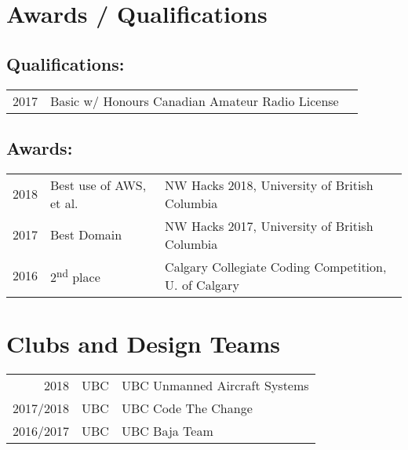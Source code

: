 \documentclass[]{deedy-resume-openfont}
\begin{document}
\begin{minipage}[t]{1.0\textwidth}
\section{Awards / Qualifications} 
\subsection{Qualifications:}
\begin{tabular}{rll}
2017         & Basic w/ Honours \quad \qquad Canadian Amateur Radio License\\
\end{tabular}

\subsection{Awards:}
\begin{tabular}{rll}
2018         & Best use of AWS, et al.      & NW Hacks 2018, University of British Columbia\\
2017         & Best Domain                  & NW Hacks 2017, University of British Columbia\\
2016         & 2\textsuperscript{nd} place  & Calgary Collegiate Coding Competition, U. of Calgary\\
\end{tabular}
\sectionsep


\section{Clubs and Design Teams} 

\begin{tabular}{rll}
2018   & UBC   & UBC Unmanned Aircraft Systems\\
2017/2018   & UBC   & UBC Code The Change\\
2016/2017   & UBC   & UBC Baja Team\\
\end{tabular}
\sectionsep

\end{minipage} 
\end{document}
